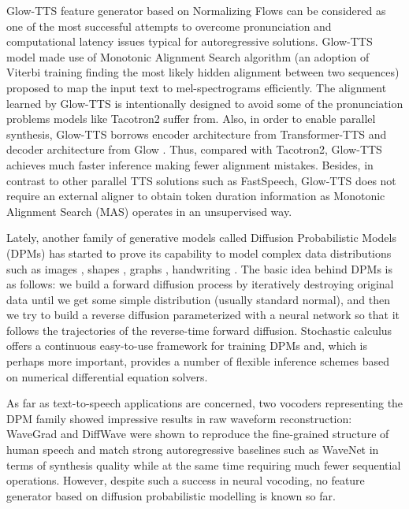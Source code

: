 \documentclass{article}
\begin{document}
Glow-TTS feature generator \cite{GlowTTS} based on Normalizing Flows can be considered as one of the most successful attempts to overcome pronunciation and computational latency issues typical for autoregressive solutions. Glow-TTS model made use of Monotonic Alignment Search algorithm (an adoption of Viterbi training \cite{Viterbi} finding the most likely hidden alignment between two sequences) proposed to map the input text to mel-spectrograms efficiently. The alignment learned by Glow-TTS is intentionally designed to avoid some of the pronunciation problems models like Tacotron2 suffer from. Also, in order to enable parallel synthesis, Glow-TTS borrows encoder architecture from Transformer-TTS \cite{TransformerTTS} and decoder architecture from Glow \cite{GlowNF}. Thus, compared with Tacotron2, Glow-TTS achieves much faster inference making fewer alignment mistakes. Besides, in contrast to other parallel TTS solutions such as FastSpeech, Glow-TTS does not require an external aligner to obtain token duration information as Monotonic Alignment Search (MAS) operates in an unsupervised way.



Lately, another family of generative models called Diffusion Probabilistic Models (DPMs) \cite{DiffusionBasic} has started to prove its capability to model complex data distributions such as images \cite{DDPM}, shapes \cite{Shapes}, graphs \cite{Graphs}, handwriting \cite{Handwriting}. 
The basic idea behind DPMs is as follows: we build a forward diffusion process by iteratively destroying original data until we get some simple distribution (usually standard normal), and then we try to build a reverse diffusion parameterized with a neural network so that it follows the trajectories of the reverse-time forward diffusion. Stochastic calculus offers a continuous easy-to-use framework for training DPMs \cite{SDE-main} and, which is perhaps more important, provides a number of flexible inference schemes based on numerical differential equation solvers.

As far as text-to-speech applications are concerned, two vocoders representing the DPM family showed impressive results in raw waveform reconstruction: WaveGrad \cite{WaveGrad} and DiffWave \cite{DiffWave} were shown to reproduce the fine-grained structure of human speech and match strong autoregressive baselines such as WaveNet in terms of synthesis quality while at the same time requiring much fewer sequential operations. However, despite such a success in neural vocoding, no feature generator based on diffusion probabilistic modelling is known so far. 
\end{document}
